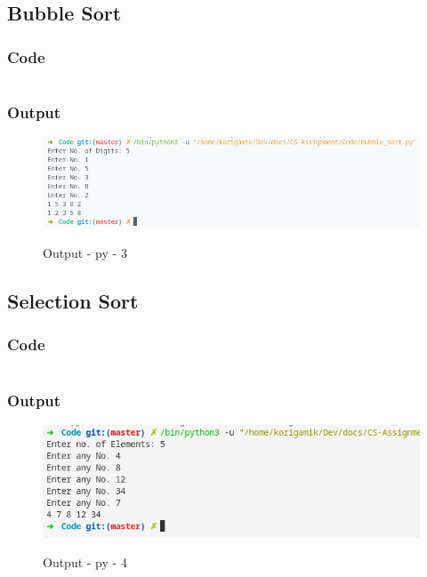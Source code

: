 \subsection{Bubble Sort}

\subsubsection{Code}

\inputminted[]{python}{../Code/bubble_sort.py}

\subsubsection{Output}
\begin{figure}[!htb]
  \centering
  \includegraphics[width=5in]{Images/bubble.png}
  \label{output:py-3}
  \caption{Output - py - 3}
\end{figure}
\pagebreak

\subsection{Selection Sort}

\subsubsection{Code}

\inputminted[]{python}{../Code/selection_sort.py}

\subsubsection{Output}
\begin{figure}[!htb]
  \centering
  \includegraphics[width=5in]{Images/selection.png}
  \label{output:py-4}
  \caption{Output - py - 4}
\end{figure}
\pagebreak

